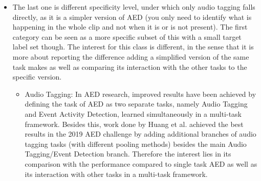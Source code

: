 \begin{itemize}
		\item The last one is different specificity level, under which only audio tagging falls directly, as it is a simpler version of AED (you only need to identify what is happening in the whole clip and not when it is or is not present). The first category can be seen as a more specific subset of this with a small target label set though. The interest for this class is different, in the sense that it is more about reporting the difference adding a simplified version of the same task makes as well as comparing its interaction with the other tasks to the specific version.
		\begin{itemize}
			\item Audio Tagging: In AED research, improved results have been achieved by defining the task of AED as two separate tasks, namely Audio Tagging and Event Activity Detection, learned simultaneously in a multi-task framework. Besides this, work done by Huang et al. achieved the best results in the 2019 AED challenge by adding additional branches of audio tagging tasks (with different pooling methods) besides the main Audio Tagging/Event Detection branch. Therefore the interest lies in its comparison with the performance compared to single task AED as well as its interaction with other tasks in a multi-task framework.
		\end{itemize}
	\end{itemize}
	
